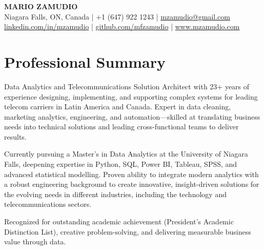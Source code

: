 \documentclass[a4paper,10pt]{article}
\begin{document}
\pagestyle{empty}


\begin{center}
    {\LARGE \textbf{MARIO ZAMUDIO}}\\
    Niagara Falls, ON, Canada \quad | \quad +1 (647) 922 1243 \quad | \quad \href{mailto:mzamudio@gmail.com}{mzamudio@gmail.com} \\
    \href{https://linkedin.com/in/mzamudio}{linkedin.com/in/mzamudio} \quad | \quad
    \href{https://github.com/mfzamudio}{github.com/mfzamudio} \quad | \quad
    \href{https://www.mzamudio.com}{www.mzamudio.com}
\end{center}

\vspace{1em}

\section*{\textcolor{myblue}{Professional Summary}}

Data Analytics and Telecommunications Solution Architect with 23+ years of experience designing, implementing, and supporting complex systems for leading telecom carriers in Latin America and Canada. Expert in data cleaning, marketing analytics, engineering, and automation—skilled at translating business needs into technical solutions and leading cross-functional teams to deliver results.

Currently pursuing a Master’s in Data Analytics at the University of Niagara Falls, deepening expertise in Python, SQL, Power BI, Tableau, SPSS, and advanced statistical modelling. Proven ability to integrate modern analytics with a robust engineering background to create innovative, insight-driven solutions for the evolving needs in different industries, including the technology and telecommunications sectors.

Recognized for outstanding academic achievement (President’s Academic Distinction List), creative problem-solving, and delivering measurable business value through data.
\end{document}
